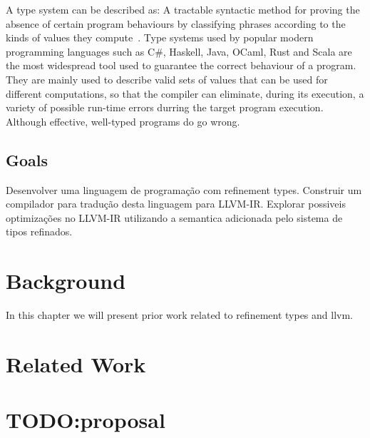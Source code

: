 \documentclass[
  english,
  lmodern,
  oneside
]{ufsc-thesis-rn46-2019/ufsc-thesis-rn46-2019}
\begin{document}
A type system can be described as: A tractable syntactic method for proving the absence of certain program behaviours by classifying phrases according to the kinds of values they compute~\cite{pierce2002types}.
Type systems used by popular modern programming languages such as C\#, Haskell, Java, OCaml, Rust and Scala are the most widespread tool used to guarantee the correct behaviour of a program.
They are mainly used to describe valid sets of values that can be used for different computations, so that the compiler can eliminate, during its execution, a variety of possible run-time errors durring the target program execution.
Although effective, well-typed programs do go wrong.


\section{Goals}\label{chapter:introduction:sec:goals}

Desenvolver uma linguagem de programação com refinement types.
Construir um compilador para tradução desta linguagem para LLVM-IR.\@
Explorar possiveis optimizações no LLVM-IR utilizando a semantica adicionada pelo sistema de tipos refinados.

\chapter{Background}\label{chapter:background}

In this chapter we will present prior work related to refinement types and llvm.

\chapter{Related Work}\label{chapter:related_work}

\chapter{TODO:\@ proposal}

\postextual{}


\apendices{}
\end{document}
